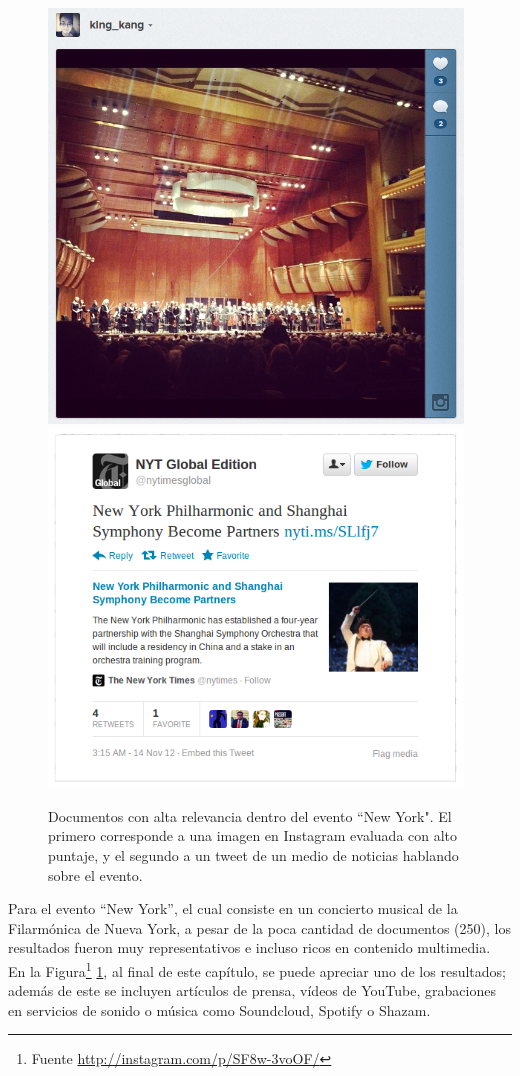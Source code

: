 \begin{figure}[h!]
  \centering
  \includegraphics[width=11cm]{./img/dvorak.png}
  \includegraphics[width=11cm]{./img/dvorak2.png}
  \caption[Imagen y documento con altos puntajes entre los resultados obtenidos]
   { Documentos con alta relevancia dentro del evento
  ``New York". El primero corresponde a una imagen en Instagram evaluada con alto puntaje, y el segundo a un tweet de un medio de noticias hablando sobre el evento. \label{fig:dvorak} }
\end{figure}

    Para el evento ``New York'', el cual consiste en un
    concierto musical de la Filarmónica de Nueva York, a pesar de la
    poca cantidad de documentos (250), los resultados fueron
    muy representativos e incluso ricos en contenido multimedia. En la
    Figura\footnote{Fuente \href{http://instagram.com/p/SF8w-3voOF/}{http://instagram.com/p/SF8w-3voOF/} }
    \ref{fig:dvorak}, al final de este capítulo, se puede apreciar uno de los resultados; 
    además de este se incluyen artículos de prensa, vídeos de YouTube,
    grabaciones en servicios de sonido o música como Soundcloud,
    Spotify o Shazam.

